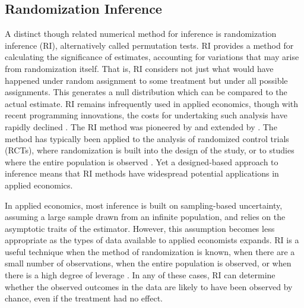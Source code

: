 \documentclass[11pt]{article}
\begin{document}
\subsection{Randomization Inference}
A distinct though related numerical method for inference is randomization inference (RI), alternatively called permutation tests. RI provides a method for calculating the significance of estimates, accounting for variations that may arise from randomization itself. That is, RI considers not just what would have happened under random assignment to some treatment but under all possible assignments. This generates a null distribution which can be compared to the actual estimate. RI remains infrequently used in applied economics, though with recent programming innovations, the costs for undertaking such analysis have rapidly declined \citep{hes_randomization_2017, young_asymptotically_2020}. The RI method was pioneered by \cite{fisher_design_1935} and extended by \cite{rosenbaum_observational_2002}. The method has typically been applied to the analysis of randomized control trials (RCTs), where randomization is built into the design of the study, or to studies where the entire population is observed \citep{ganong_permutation_2018}. Yet a designed-based approach to inference means that RI methods have widespread potential applications in applied economics.

In applied economics, most inference is built on sampling-based uncertainty, assuming a large sample drawn from an infinite population, and relies on the asymptotic traits of the estimator. However, this assumption becomes less appropriate as the types of data available to applied economists expands. RI is a useful technique when the method of randomization is known, when there are a small number of observations, when the entire population is observed, or when there is a high degree of leverage \citep{young_channeling_2019}. In any of these cases, RI can determine whether the observed outcomes in the data are likely to have been observed by chance, even if the treatment had no effect.
\end{document}
